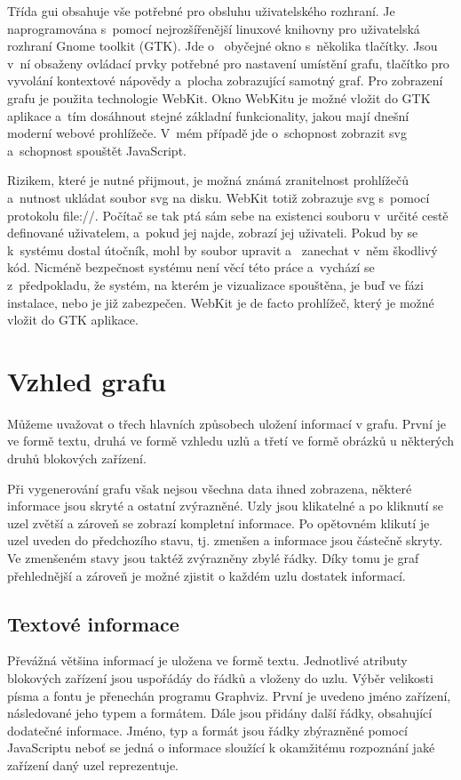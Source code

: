 \documentclass[color,table,oneside,nolot,nolof]{fithesis}
\begin{document}
	Třída gui obsahuje vše potřebné pro obsluhu uživatelského rozhraní. Je naprogramována s~pomocí nejrozšířenější linuxové knihovny pro uživatelská rozhraní Gnome toolkit (GTK). Jde o~
	obyčejné okno s~několika tlačítky. Jsou v~ní obsaženy ovládací prvky potřebné pro nastavení umístění grafu, tlačítko pro vyvolání kontextové
	nápovědy a~plocha zobrazující samotný graf. Pro zobrazení grafu je použita technologie WebKit. Okno WebKitu je možné vložit do GTK aplikace a~tím dosáhnout stejné základní funkcionality,
	jakou mají dnešní moderní webové prohlížeče. V~mém případě jde o~schopnost zobrazit svg a~schopnost spouštět JavaScript.

	Rizikem, které je nutné přijmout, je možná známá zranitelnost prohlížečů a~nutnost ukládat soubor svg na disku. WebKit totiž zobrazuje svg s~pomocí protokolu file://. Počítač se
	tak ptá sám sebe na existenci souboru v~určité cestě definované uživatelem, a~pokud jej najde, zobrazí jej uživateli. Pokud by se k~systému dostal útočník, mohl by soubor upravit a~
	zanechat v~něm škodlivý kód. Nicméně bezpečnost systému není věcí této práce a~vychází se z~předpokladu, že systém, na kterém je vizualizace spouštěna, je buď ve fázi instalace, nebo
	je již zabezpečen. WebKit je de facto prohlížeč, který je možné vložit do GTK aplikace.

\chapter{Vzhled grafu}
  Můžeme uvažovat o třech hlavních způsobech uložení informací v grafu. První je ve formě textu, druhá ve formě vzhledu uzlů a třetí ve formě obrázků 
	u některých druhů blokových zařízení. 

	Při vygenerování grafu však nejsou všechna data ihned zobrazena, některé informace jsou skryté a ostatní zvýrazněné. Uzly jsou klikatelné a po kliknutí
	se uzel zvětší a zároveň se zobrazí kompletní informace. Po opětovném klikutí je uzel uveden do předchozího stavu, tj. zmenšen a informace jsou částečně 
	skryty. Ve zmenšeném stavy jsou taktéž zvýrazněny zbylé řádky. Díky tomu je graf přehlednější a zároveň je možné zjistit o každém uzlu dostatek informací.

\section{Textové informace}
  Převážná většina informací je uložena ve formě textu. Jednotlivé atributy blokových zařízení jsou uspořádáy do řádků a vloženy do uzlu. Výběr velikosti
	písma a fontu je přenechán programu Graphviz. První je uvedeno jméno zařízení, následované jeho typem a formátem. Dále jsou přidány další řádky, 
	obsahující dodatečné informace. Jméno, typ a formát jsou řádky zbýrazněné pomocí JavaScriptu neboť se jedná o informace sloužící k okamžitému rozpoznání
	jaké zařízení daný uzel reprezentuje.
\end{document}

